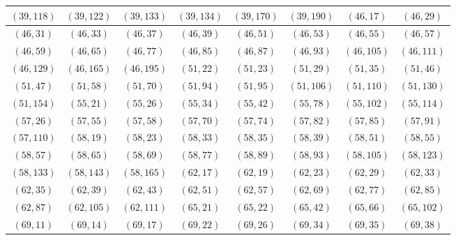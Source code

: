\documentclass[11pt,reqno]{amsart}
\theoremstyle{definition}
\begin{document}
\begin{longtable}{|c|c|c|c|c|c|c|c|}
$ ( 39 , 118 )$
 & 
$ ( 39 , 122 )$
 & 
$ ( 39 , 133 )$
 & 
$ ( 39 , 134 )$
 & 
$ ( 39 , 170 )$
 & 
$ ( 39 , 190 )$
 & 
$ ( 46 , 17 )$
 & 
$ ( 46 , 29 )$
\\ \hline
$ ( 46 , 31 )$
 & 
$ ( 46 , 33 )$
 & 
$ ( 46 , 37 )$
 & 
$ ( 46 , 39 )$
 & 
$ ( 46 , 51 )$
 & 
$ ( 46 , 53 )$
 & 
$ ( 46 , 55 )$
 & 
$ ( 46 , 57 )$
\\ \hline
$ ( 46 , 59 )$
 & 
$ ( 46 , 65 )$
 & 
$ ( 46 , 77 )$
 & 
$ ( 46 , 85 )$
 & 
$ ( 46 , 87 )$
 & 
$ ( 46 , 93 )$
 & 
$ ( 46 , 105 )$
 & 
$ ( 46 , 111 )$
\\ \hline
$ ( 46 , 129 )$
 & 
$ ( 46 , 165 )$
 & 
$ ( 46 , 195 )$
 & 
$ ( 51 , 22 )$
 & 
$ ( 51 , 23 )$
 & 
$ ( 51 , 29 )$
 & 
$ ( 51 , 35 )$
 & 
$ ( 51 , 46 )$
\\ \hline
$ ( 51 , 47 )$
 & 
$ ( 51 , 58 )$
 & 
$ ( 51 , 70 )$
 & 
$ ( 51 , 94 )$
 & 
$ ( 51 , 95 )$
 & 
$ ( 51 , 106 )$
 & 
$ ( 51 , 110 )$
 & 
$ ( 51 , 130 )$
\\ \hline
$ ( 51 , 154 )$
 & 
$ ( 55 , 21 )$
 & 
$ ( 55 , 26 )$
 & 
$ ( 55 , 34 )$
 & 
$ ( 55 , 42 )$
 & 
$ ( 55 , 78 )$
 & 
$ ( 55 , 102 )$
 & 
$ ( 55 , 114 )$
\\ \hline
$ ( 57 , 26 )$
 & 
$ ( 57 , 55 )$
 & 
$ ( 57 , 58 )$
 & 
$ ( 57 , 70 )$
 & 
$ ( 57 , 74 )$
 & 
$ ( 57 , 82 )$
 & 
$ ( 57 , 85 )$
 & 
$ ( 57 , 91 )$
\\ \hline
$ ( 57 , 110 )$
 & 
$ ( 58 , 19 )$
 & 
$ ( 58 , 23 )$
 & 
$ ( 58 , 33 )$
 & 
$ ( 58 , 35 )$
 & 
$ ( 58 , 39 )$
 & 
$ ( 58 , 51 )$
 & 
$ ( 58 , 55 )$
\\ \hline
$ ( 58 , 57 )$
 & 
$ ( 58 , 65 )$
 & 
$ ( 58 , 69 )$
 & 
$ ( 58 , 77 )$
 & 
$ ( 58 , 89 )$
 & 
$ ( 58 , 93 )$
 & 
$ ( 58 , 105 )$
 & 
$ ( 58 , 123 )$
\\ \hline
$ ( 58 , 133 )$
 & 
$ ( 58 , 143 )$
 & 
$ ( 58 , 165 )$
 & 
$ ( 62 , 17 )$
 & 
$ ( 62 , 19 )$
 & 
$ ( 62 , 23 )$
 & 
$ ( 62 , 29 )$
 & 
$ ( 62 , 33 )$
\\ \hline
$ ( 62 , 35 )$
 & 
$ ( 62 , 39 )$
 & 
$ ( 62 , 43 )$
 & 
$ ( 62 , 51 )$
 & 
$ ( 62 , 57 )$
 & 
$ ( 62 , 69 )$
 & 
$ ( 62 , 77 )$
 & 
$ ( 62 , 85 )$
\\ \hline
$ ( 62 , 87 )$
 & 
$ ( 62 , 105 )$
 & 
$ ( 62 , 111 )$
 & 
$ ( 65 , 21 )$
 & 
$ ( 65 , 22 )$
 & 
$ ( 65 , 42 )$
 & 
$ ( 65 , 66 )$
 & 
$ ( 65 , 102 )$
\\ \hline
$ ( 69 , 11 )$
 & 
$ ( 69 , 14 )$
 & 
$ ( 69 , 17 )$
 & 
$ ( 69 , 22 )$
 & 
$ ( 69 , 26 )$
 & 
$ ( 69 , 34 )$
 & 
$ ( 69 , 35 )$
 & 
$ ( 69 , 38 )$
\\ \hline

\end{longtable}
\end{document}
